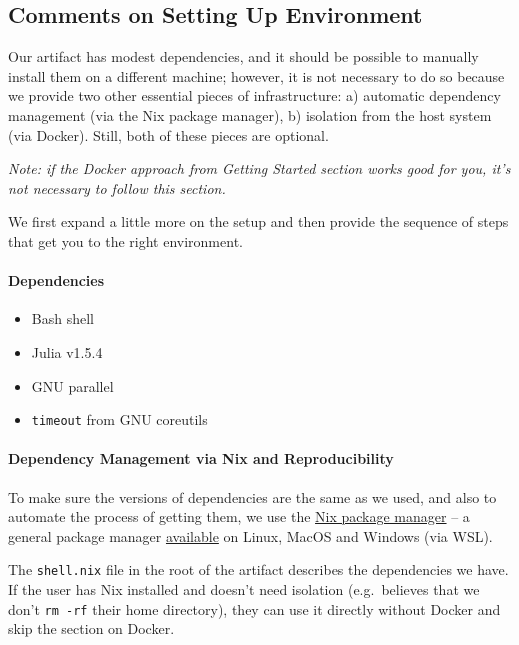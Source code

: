 \documentclass[
]{article}
\begin{document}
\hypertarget{comments-on-setting-up-environment}{%
\subsection{Comments on Setting Up
Environment}\label{comments-on-setting-up-environment}}

Our artifact has modest dependencies, and it should be possible to
manually install them on a different machine; however, it is not necessary
to do so because we provide two other essential
pieces of infrastructure: a) automatic dependency management (via the
Nix package manager), b) isolation from the host system (via Docker).
Still, both of these pieces are optional.

\textit{Note: if the Docker approach from Getting Started section works good for
you, it's not necessary to follow this section.}

We first expand a little more on the setup and then provide the sequence
of steps that get you to the right environment.

\hypertarget{dependencies}{%
\paragraph{Dependencies}\label{dependencies}}

\begin{itemize}
\item
  Bash shell
\item
  Julia v1.5.4
\item
  GNU parallel
\item
  \texttt{timeout} from GNU coreutils
\end{itemize}

\hypertarget{dependency-management-via-nix-and-reproducibility}{%
\paragraph{Dependency Management via Nix and
Reproducibility}\label{dependency-management-via-nix-and-reproducibility}}

To make sure the versions of dependencies are the same as we used, and
also to automate the process of getting them, we use the
\href{https://nixos.org/manual/nix/stable/\#chap-introduction}{Nix
package manager} -- a general package manager
\href{https://nixos.org/guides/install-nix.html}{available} on Linux,
MacOS and Windows (via WSL).

The \texttt{shell.nix} file in the root of the artifact describes the
dependencies we have. If the user has Nix installed and doesn't need
isolation (e.g.~believes that we don't \texttt{rm\ -rf} their home
directory), they can use it directly without Docker and skip the
section on Docker.
\end{document}
